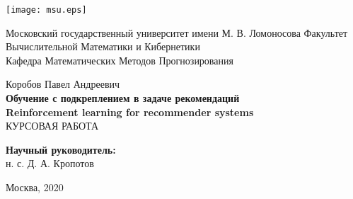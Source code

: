 \documentclass[a4paper, 12pt]{article}
\begin{document}
\begin{titlepage}
\begin{center}

    \bigskip
    \texttt{[image: msu.eps]}

    Московский государственный университет имени М. В. Ломоносова
    Факультет Вычислительной Математики и Кибернетики \\
    Кафедра Математических Методов Прогнозирования \\

	\vspace{25mm}	

	{\large
    Коробов Павел Андреевич  \\[5mm]
    {\bfseries Обучение с подкреплением в задаче рекомендаций} \\[5mm]
    {\bfseries Reinforcement learning for recommender systems } \\[5mm]
         КУРСОВАЯ РАБОТА \\[10mm]
	}
		
	\vspace{25mm}	
	
    \begin{flushright}
            {\bfseries Научный руководитель:} \\
            н. с. Д. А. Кропотов
    \end{flushright}

    \vspace{\fill}
    Москва, 2020
\end{center}
\end{titlepage}

\newpage
\renewcommand{\contentsname}{Содержание}
\tableofcontents

\end{document}
